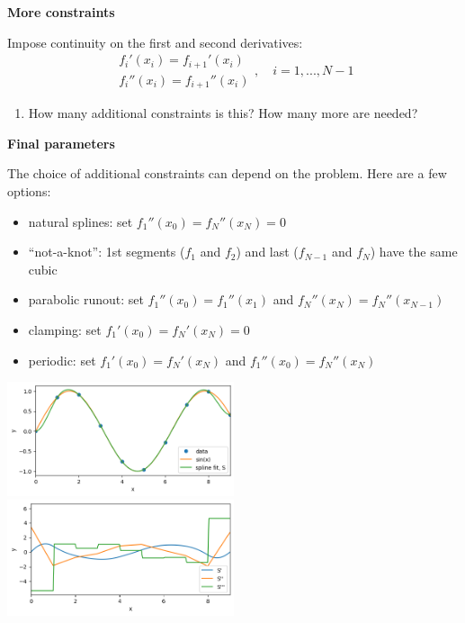 \documentclass[12pt,letterpaper,noanswers]{exam}
\begin{document}
\noindent\textbf{More constraints}
\begin{tcolorbox}
Impose continuity on the first and second derivatives: 
\[\begin{array}{l}
f_i'(x_i) = f_{i+1}'(x_i) \\
f_i''(x_i) = f_{i+1}''(x_i)
\end{array}, \quad i = 1,...,N-1\]
\end{tcolorbox}
\begin{enumerate}[resume=classQ]
\item How many additional constraints is this?  How many more are needed?
\vspace{1cm}

\end{enumerate}
\noindent\textbf{Final parameters}
\begin{tcolorbox}
The choice of additional constraints can depend on the problem.  Here are a few options:
\begin{itemize}
\itemsep0pt
    \item natural splines: set $f_1''(x_0) = f_N''(x_N) = 0$
    \item ``not-a-knot'': 1st segments ($f_1$ and $f_2$) and last ($f_{N-1}$ and $f_N$) have the same cubic
    \item parabolic runout: set $f_1''(x_0) = f_1''(x_1)$ and $f_N''(x_N) = f_N''(x_{N-1})$
    \item clamping: set $f_1'(x_0) = f_N'(x_N) = 0$
    \item periodic: set $f_1'(x_0) = f_N'(x_N)$ and $f_1''(x_0) = f_N''(x_N)$
\end{itemize}
\end{tcolorbox}

\includegraphics[width=0.5\textwidth]{img/Class09clamp.png}
\includegraphics[width=0.5\textwidth]{img/Class09clampderiv.png}
\end{document}
